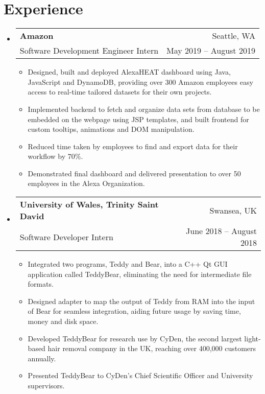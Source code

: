 \documentclass[letterpaper,11pt]{article}
\makeatletter
\newcommand{\resumeSubheading}[4]{
  \vspace{-1pt}\item
    \begin{tabular*}{0.98\textwidth}[t]{l@{\extracolsep{\fill}}r}
      \textbf{#1} & #2 \\
      {\small#3} & {\small #4} \\
    \end{tabular*}\vspace{-5pt}
}
\newcommand{\resumeSubHeadingListStart}{\begin{itemize}[leftmargin=*]}
\newcommand{\resumeSubHeadingListEnd}{\end{itemize}}
\newcommand{\resumeItemListStart}{\begin{itemize}[leftmargin=*]}
\newcommand{\resumeItemListEnd}{\end{itemize}\vspace{-5pt}}
\makeatother
\begin{document}
\section{Experience}
\resumeSubHeadingListStart
    \resumeSubheading
      {Amazon}{Seattle, WA}
      {Software Development Engineer Intern}{May 2019 -- August 2019}
      \resumeItemListStart
        \item {Designed, built and deployed AlexaHEAT dashboard using Java, JavaScript and DynamoDB, providing over 300 Amazon employees easy access to real-time tailored datasets for their own projects.}
	\item {Implemented backend to fetch and organize data sets from database to be embedded on the webpage using JSP templates, and built frontend for custom tooltips, animations and DOM manipulation.}
        \item {Reduced time taken by employees to find and export data for their workflow by 70\%.}
        \item {Demonstrated final dashboard and delivered presentation to over 50 employees in the Alexa Organization.}
      \resumeItemListEnd

    \resumeSubheading
      {University of Wales, Trinity Saint David}{Swansea, UK}
      {Software Developer Intern}{June 2018 -- August 2018}
      \resumeItemListStart
        \item
          {Integrated two programs, Teddy and Bear, into a C++ Qt GUI application called TeddyBear, eliminating the need for intermediate file formats.}
        \item
          {Designed adapter to map the output of Teddy from RAM into the input of Bear for seamless integration, aiding future usage by saving time, money and disk space.}
        \item
          {Developed TeddyBear for research use by CyDen, the second largest light-based hair removal company in the UK, reaching over 400,000 customers annually.}
        \item
          {Presented TeddyBear to CyDen's Chief Scientific Officer and University supervisors.}
      \resumeItemListEnd

\resumeSubHeadingListEnd

\end{document}
